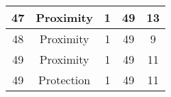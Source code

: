 \documentclass[results.tex]{subfiles}
\begin{document}
\begin{center}
\begin{tabular}{| c || c | c | c | c |}
            \hline
            47                      & Proximity                    & 1                      & 49                      & 13                   \\
            \hline
            48                      & Proximity                    & 1                      & 49                      & 9                    \\
            \hline
            49                      & Proximity                    & 1                      & 49                      & 11                   \\
            \hline
            49                      & Protection                   & 1                      & 49                      & 11                   \\
            \hline
        \end{tabular}
    \end{center}
\end{document}
